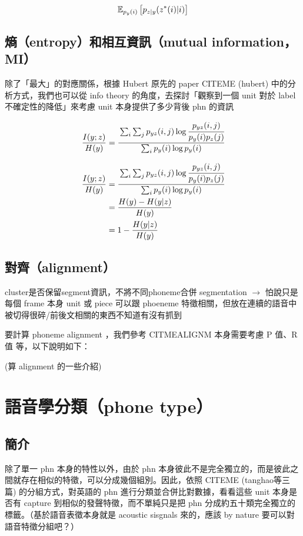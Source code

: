 $$\mathbb{E}_{p_y(i)}\left[p_{z|y}(z^*(i)|i) \right]$$

\subsection{熵（entropy）和相互資訊（mutual information，MI）}

除了「最大」的對應關係，根據 Hubert 原先的 paper CITEME (hubert) 中的分析方式，我們也可以從 info theory 的角度，去探討「觀察到一個 unit 對於 label 不確定性的降低」來考慮 unit 本身提供了多少背後 phn 的資訊

$$\frac{I(y;z)}{H(y)}=\cfrac{\sum_i \sum_j p_{yz}(i, j) \log \cfrac{p_{yz}(i, j)}{p_y(i)p_z(j)}}{\sum_i p_y(i) \log p_y(i)}$$

\begin{align}
\frac{I(y;z)}{H(y)}&=\cfrac{\sum_i \sum_j p_{yz}(i, j) \log \cfrac{p_{yz}(i, j)}{p_y(i)p_z(j)}}{\sum_i p_y(i) \log p_y(i)} \\
&=\frac{H(y)-H(y|z)}{H(y)} \\
&=1-\frac{H(y|z)}{H(y)}
\end{align}



\subsection{對齊（alignment）}
cluster是否保留segment資訊，不將不同phoneme合併
segmentation $\rightarrow$
怕說只是每個 frame 本身 unit 或 piece 可以跟 phoeneme 特徵相關，但放在連續的語音中被切得很碎/前後文相關的東西不知道有沒有抓到

要計算 phoneme alignment ，我們參考 CITMEALIGNM 本身需要考慮 P 值、R 值 等，以下說明如下：

(算 alignment 的一些介紹)

\section{語音學分類（phone type）}

\subsection{簡介}

除了單一 phn 本身的特性以外，由於 phn 本身彼此不是完全獨立的，而是彼此之間就存在相似的特徵，可以分成幾個組別。因此，依照 CITEME (tanghao等三篇) 的分組方式，對英語的 phn 進行分類並合併比對數據，看看這些 unit 本身是否有 capture 到相似的發聲特徵，而不單純只是把 phn 分成約五十類完全獨立的標籤。（基於語音表徵本身就是 acoustic sisgnals 來的，應該 by nature 要可以對語音特徵分組吧？）

